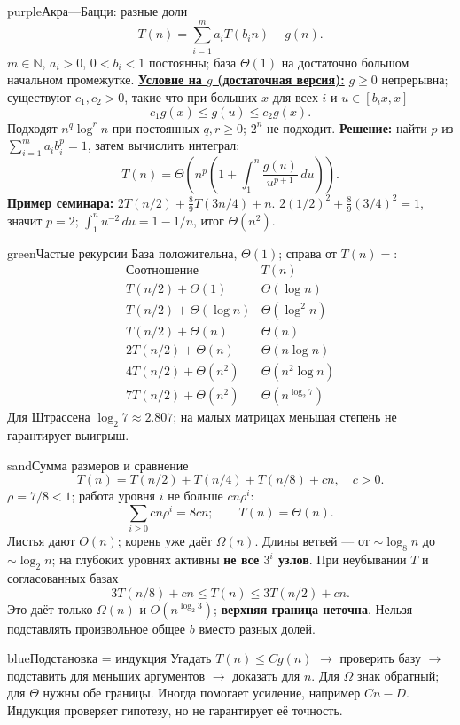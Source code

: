 \documentclass[a4paper,10pt]{article}
\newcommand{\key}[1]{\textbf{#1}}
\newlength{\colmax}
\newcounter{cheatcolnum}
\newenvironment{sheetcol}[1][.486\textwidth]{%
 \begin{lrbox}{\cheatcol}\begin{minipage}[t]{#1}\vspace{0pt}
}{%
 \end{minipage}\end{lrbox}\stepcounter{cheatcolnum}%
 \typeout{CHEAT-COLUMN-\thecheatcolnum: \the\dimexpr\ht\cheatcol+\dp\cheatcol\relax; LIMIT \the\colmax}%
 \ifdim\dimexpr\ht\cheatcol+\dp\cheatcol\relax>\colmax
 \PackageError{cheat}{Column \thecheatcolnum\space exceeds planned height}{Shorten content; keep body text at least 10pt.}\fi
 \usebox{\cheatcol}}
\begin{document}
\begin{sheetcol}
\begin{card}{purple}{Акра---Бацци: разные доли\smash{\textsuperscript{*}}}
\[
T(n)=\sum_{i=1}^{m}a_iT(b_i n)+g(n).
\]
$m\in\mathbb N$, $a_i>0$, $0<b_i<1$ постоянны; база $\Theta(1)$
на достаточно большом начальном промежутке.
\key{\href{https://courses.csail.mit.edu/6.046/spring04/handouts/akrabazzi.pdf}{Условие на $g$ (достаточная версия):}}
$g\ge0$ непрерывна; существуют $c_1,c_2>0$, такие что
при больших $x$ для всех $i$ и $u\in[b_i x,x]$
\[
c_1g(x)\le g(u)\le c_2g(x).
\]
Подходят $n^q\log^r n$ при постоянных $q,r\ge0$;
$2^n$ не подходит.
\key{Решение:} найти $p$ из $\sum_{i=1}^{m}a_i b_i^p=1$,
затем вычислить интеграл:
\[
\boxed{T(n)=\Theta\!\left(n^p\!\left(1+
\int_{1}^{n}\frac{g(u)}{u^{p+1}}\,du\right)\right).}
\]
\key{Пример семинара:} $2T(n/2)+\frac89T(3n/4)+n$.
$2(1/2)^2+\frac89(3/4)^2=1$, значит $p=2$;
$\int_1^n u^{-2}\,du=1-1/n$, итог $\Theta(n^2)$.
\end{card}

\begin{card}{green}{Частые рекурсии}
База положительна, $\Theta(1)$; справа от $T(n)=$:
\[
\begin{array}{l|l}
\text{Соотношение} & T(n)\\ \hline
T(n/2)+\Theta(1) & \Theta(\log n)\\
T(n/2)+\Theta(\log n) & \Theta(\log^2n)\\
T(n/2)+\Theta(n) & \Theta(n)\\
2T(n/2)+\Theta(n) & \Theta(n\log n)\\
4T(n/2)+\Theta(n^2) & \Theta(n^2\log n)\\
7T(n/2)+\Theta(n^2) & \Theta(n^{\log_2 7})
\end{array}
\]
Для Штрассена $\log_2 7\approx2.807$; на малых
матрицах меньшая степень не гарантирует выигрыш.
\end{card}

\begin{card}{sand}{Сумма размеров и сравнение\smash{\textsuperscript{*}}}
\[
T(n)=T(n/2)+T(n/4)+T(n/8)+cn,\quad c>0.
\]
$\rho=7/8<1$; работа уровня $i$ не больше $cn\rho^i$:
\[
\sum_{i\ge0}cn\rho^i=8cn;\qquad T(n)=\Theta(n).
\]
Листья дают $O(n)$; корень уже даёт $\Omega(n)$.
Длины ветвей --- от $\sim\log_8n$ до $\sim\log_2n$;
на глубоких уровнях активны \key{не все $3^i$ узлов}.
При неубывании $T$ и согласованных базах
\[
3T(n/8)+cn\le T(n)\le3T(n/2)+cn.
\]
Это даёт только $\Omega(n)$ и $O(n^{\log_2 3})$;
\key{верхняя граница неточна}. Нельзя подставлять
произвольное общее $b$ вместо разных долей.
\end{card}

\begin{card}{blue}{Подстановка = индукция\smash{\textsuperscript{*}}}
Угадать $T(n)\le Cg(n)$ $\to$ проверить базу $\to$
подставить для меньших аргументов $\to$ доказать для $n$.
Для $\Omega$ знак обратный; для $\Theta$ нужны обе границы.
Иногда помогает усиление, например $Cn-D$.
Индукция проверяет гипотезу, но не гарантирует её точность.
\end{card}
\end{sheetcol}
\endgroup
\end{document}

